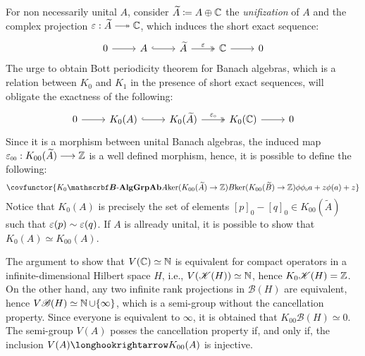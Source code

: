 \begin{definicao}
\begin{itroman}
For non necessarily unital $A$, consider $\widetilde{A} \coloneqq A \oplus \operatorname{\mathbb{C}}$ the \textit{unifization} of $A$ and the complex projection $\varepsilon: \widetilde{A} \longtwoheadrightarrow \C$, which induces the short exact sequence:
\begin{equation*}
    \label{eq:short exact sequence unital}
\begin{tikzcd}
    0 \arrow[r] & A \arrow[r, hook] & \widetilde A \arrow[r, "\varepsilon", two heads] & \mathbb C \arrow[r] & 0
    \end{tikzcd}
\end{equation*}
The urge to obtain Bott periodicity theorem for Banach algebras, which is a relation between $K_0$ and $K_1$ in the presence of short exact sequences, will obligate the exactness of the following:
\begin{equation*}
    \label{eq:K0(short exact sequence unital)}
\begin{tikzcd}
    0 \arrow[r] & K_0(A) \arrow[r, hook] & K_0(\widetilde A) \arrow[r, "\sub\varepsilon0", two heads] & K_0(\mathbb C) \arrow[r] & 0
    \end{tikzcd}
\end{equation*}
Since it is a morphism between unital Banach algebras, the induced map $\sub{\ep}{00} : K_{00}(\widetilde{A}) \longto \Z$ is a well defined morphism, hence, it is possible to define the following:
\begin{equation*}
    \covfunctor{{K_0}{\BAlg}{\Ab{\Grp}}{A}{\ker(K_{00}(\widetilde{A}) \to \Z)}{B}{\ker(K_{00}(\widetilde{B}) \to \Z)}{\phi}{\sub\phi0}{a+ z}{\phi(a)+z}}
\end{equation*}
Notice that $K_0(A)$ is precisely the set of elements $[p]_0-[q]_0 \in K_{00}(\widetilde{A})$ such that $\operatorname{{\varepsilon}}(p) \sim \operatorname{{\varepsilon}}(q)$. If $A$ is allready unital, it is possible to show that $K_0(A) \simeq K_{00}(A)$. 
\end{itroman}
\end{definicao}

\begin{observacao}
    The argument to show that $V(\operatorname{\mathbb{C}}) \simeq \operatorname{\mathbb{N}}$  is equivalent for compact operators in a infinite-dimensional Hilbert space $H$, i.e., $V(\mathscr K(H)) \simeq \operatorname{\mathbb{N}}$, hence $K_0\mathscr K(H) = \operatorname{\mathbb{Z}}$. On the other hand, any two infinite rank projections in $\mathscr B(H)$ are equivalent, hence $V\mathscr B(H) \simeq \operatorname{\mathbb{N}} \cup \{\infty\}$, which is a semi-group without the cancellation property. Since everyone is equivalent to $\infty$, it is obtained that $K_{00}\mathscr B(H) \simeq 0$. The semi-group $V(A)$ posses the cancellation property if, and only if, the inclusion $V(A)\longhookrightarrow K_{00}(A)$ is injective. 
\end{observacao}

